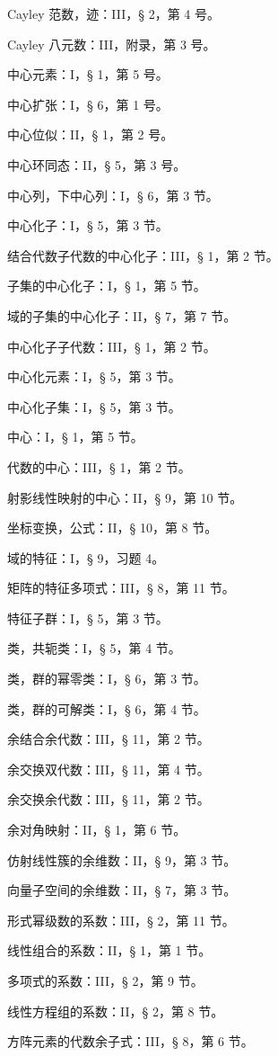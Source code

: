 Cayley 范数，迹：III，§ 2，第 4 号。

Cayley 八元数：III，附录，第 3 号。

中心元素：I，§ 1，第 5 号。

中心扩张：I，§ 6，第 1 号。

中心位似：II，§ 1，第 2 号。

中心环同态：II，§ 5，第 3 号。

中心列，下中心列：I，§ 6，第 3 节。

中心化子：I，§ 5，第 3 节。

结合代数子代数的中心化子：III，§ 1，第 2 节。

子集的中心化子：I，§ 1，第 5 节。

域的子集的中心化子：II，§ 7，第 7 节。

中心化子子代数：III，§ 1，第 2 节。

中心化元素：I，§ 5，第 3 节。

中心化子集：I，§ 5，第 3 节。

中心：I，§ 1，第 5 节。

代数的中心：III，§ 1，第 2 节。

射影线性映射的中心：II，§ 9，第 10 节。

坐标变换，公式：II，§ 10，第 8 节。

域的特征：I，§ 9，习题 4。

矩阵的特征多项式：III，§ 8，第 11 节。

特征子群：I，§ 5，第 3 节。

类，共轭类：I，§ 5，第 4 节。

类，群的幂零类：I，§ 6，第 3 节。

类，群的可解类：I，§ 6，第 4 节。

余结合余代数：III，§ 11，第 2 节。

余交换双代数：III，§ 11，第 4 节。

余交换余代数：III，§ 11，第 2 节。

余对角映射：II，§ 1，第 6 节。

仿射线性簇的余维数：II，§ 9，第 3 节。

向量子空间的余维数：II，§ 7，第 3 节。

形式幂级数的系数：III，§ 2，第 11 节。

线性组合的系数：II，§ 1，第 1 节。

多项式的系数：III，§ 2，第 9 节。

线性方程组的系数：II，§ 2，第 8 节。

方阵元素的代数余子式：III，§ 8，第 6 节。

